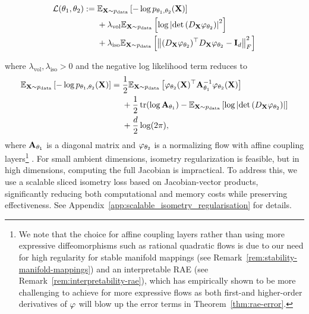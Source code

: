 \begin{equation}\label{eq:basic_training_objective}
\begin{aligned}
\mathcal{L}(\theta_1, \theta_2) :=\; 
& \mathbb{E}_{\mathbf{X} \sim p_{\text{data}}}\left[-\log p_{\theta_1, \theta_2}(\mathbf{X})\right] \\
& + \lambda_{\text{vol}} \mathbb{E}_{\mathbf{X} \sim p_{\text{data}}}\left[ \log\left|\det \left( D_{\mathbf{X}} \varphi_{\theta_2} \right)\right|^2 \right] \\
& + \lambda_{\text{iso}} \mathbb{E}_{\mathbf{X} \sim p_{\text{data}}}\left[ \left\| (D_{\mathbf{X}} \varphi_{\theta_2})^\top D_{\mathbf{X}} \varphi_{\theta_2} - \mathbf{I}_d \right\|_F^2 \right]
\end{aligned}
\end{equation}

where $\lambda_{\text{vol}}, \lambda_{\text{iso}} >0$ and the negative log likelihood term reduces to
\begin{equation}
\begin{aligned}
\mathbb{E}_{\mathbf{X} \sim p_{\text{data}}}\left[-\log p_{\theta_1, \theta_2}(\mathbf{X})\right] =\;
& \frac{1}{2} \mathbb{E}_{\mathbf{X} \sim p_{\text{data}}}\left[\varphi_{\theta_2}(\mathbf{X})^\top \mathbf{A}_{\theta_1}^{-1} \varphi_{\theta_2}(\mathbf{X}) \right] \\
& + \frac{1}{2} \operatorname{tr}(\log \mathbf{A}_{\theta_1}) 
- \mathbb{E}_{\mathbf{X} \sim p_{\text{data}}}\left[ \log \left|\det \left( D_{\mathbf{X}} \varphi_{\theta_2} \right) \right| \right] \\
& + \frac{d}{2} \log(2\pi),
\end{aligned}
\end{equation}
where $\mathbf{A}_{\theta_1}$ is a diagonal matrix and $\varphi_{\theta_2}$ is a normalizing flow with affine coupling layers\footnote{We note that the choice for affine coupling layers rather than using more expressive diffeomorphisms such as rational quadratic flows \cite{durkan2019neural} is due to our need for high regularity for stable manifold mappings (see Remark~\ref{rem:stability-manifold-mappings}) and an interpretable RAE (see Remark~\ref{rem:interpretability-rae}), which has empirically shown to be more challenging to achieve for more expressive flows as both first-and higher-order derivatives of $\varphi$ will blow up the error terms in Theorem~\ref{thm:rae-error}.} \cite{dinh2017density}. For small ambient dimensions, isometry regularization is feasible, but in high dimensions, computing the full Jacobian is impractical. To address this, we use a scalable sliced isometry loss based on Jacobian-vector products, significantly reducing both computational and memory costs while preserving effectiveness. See Appendix~\ref{app:scalable_isometry_regularisation} for details.

